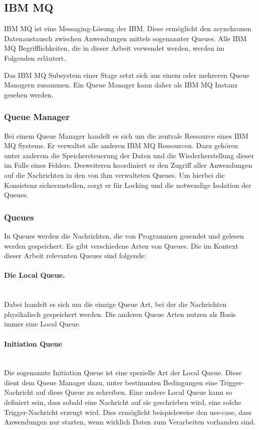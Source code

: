 \subsection{IBM MQ}\label{sec:mq}
IBM MQ ist eine Messaging-Lösung der IBM.
Diese ermöglicht den asynchronen Datenaustausch zwischen Anwendungen mittels sogenannter Queues.
Alle IBM MQ Begrifflichkeiten, die in dieser Arbeit verwendet werden, werden im Folgenden erläutert.
\cite[Kap. 3.2]{Aranha.2013}

Das IBM MQ Subsystem einer Stage setzt sich aus einem oder mehreren Queue Managern zusammen.
Ein Queue Manager kann daher als IBM MQ Instanz gesehen werden.

\subsubsection{Queue Manager}
Bei einem Queue Manager handelt es sich um die zentrale Ressource eines IBM MQ Systems.
Er verwaltet  alle anderen IBM MQ Ressourcen.
Dazu gehören unter anderem die Speichersteuerung der Daten und die Wiederherstellung dieser im Falle eines Fehlers.
Desweiteren koordiniert er den Zugriff aller Anwendungen auf die Nachrichten in den von ihm verwalteten Queues.
Um hierbei die Konsistenz sicherzustellen, sorgt er für Locking und die notwendige Isolation der Queues.
\cite[S. 36]{Aranha.2013}

\subsubsection{Queues}
In Queues werden die Nachrichten, die von Programmen gesendet und gelesen werden gespeichert.
Es gibt verschiedene Arten von Queues. 
Die im Kontext dieser Arbeit relevanten Queues sind folgende:

\paragraph{Die Local Queue.}~\\
Dabei handelt es sich um die einzige Queue Art, bei der die Nachrichten physikalisch gespeichert werden.
Die anderen Queue Arten nutzen als Basis immer eine Local Queue.

\paragraph{Initiation Queue}~\\
Die sogenannte \glqq Initiation Queue\grqq{} ist eine spezielle Art der Local Queue.
Diese dient dem Queue Manager dazu, unter bestimmten Bedingungen eine Trigger-Nachricht auf diese Queue zu schreiben.
Eine andere Local Queue kann so definiert sein, dass sobald eine Nachricht auf sie geschrieben wird, eine solche Trigger-Nachricht erzeugt wird.
Dies ermöglicht beispielsweise den use-case, dass Anwendungen nur starten, wenn wirklich Daten zum Verarbeiten vorhanden sind.
\cite[S. 37-38]{Aranha.2013}

